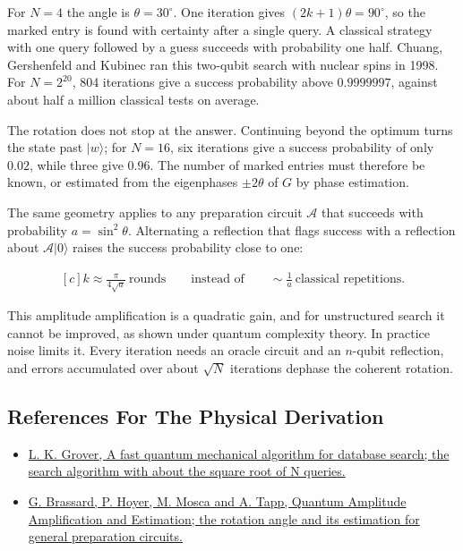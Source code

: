\documentclass[11pt,oneside]{book}
\newenvironment{centeredalign}{\[\begin{gathered}[c]}{\end{gathered}\]}
\begin{document}
For \(N=4\) the angle is \(\theta=30^\circ\). One iteration gives \((2k+1)\theta=90^\circ\), so the marked entry is found with certainty after a single query. A classical strategy with one query followed by a guess succeeds with probability one half. Chuang, Gershenfeld and Kubinec ran this two-qubit search with nuclear spins in 1998. For \(N=2^{20}\), 804 iterations give a success probability above \(0.9999997\), against about half a million classical tests on average.

The rotation does not stop at the answer. Continuing beyond the optimum turns the state past \(|w\rangle\); for \(N=16\), six iterations give a success probability of only \(0.02\), while three give \(0.96\). The number of marked entries must therefore be known, or estimated from the eigenphases \(\pm2\theta\) of \(G\) by phase estimation.

The same geometry applies to any preparation circuit \(\mathcal A\) that succeeds with probability \(a=\sin^2\theta\). Alternating a reflection that flags success with a reflection about \(\mathcal A|0\rangle\) raises the success probability close to one:

\begin{centeredalign}
k\approx\frac{\pi}{4\sqrt a}\ \text{rounds}\qquad\text{instead of}\qquad\sim\frac1a\ \text{classical repetitions}.
\end{centeredalign}

This amplitude amplification is a quadratic gain, and for unstructured search it cannot be improved, as shown under quantum complexity theory. In practice noise limits it. Every iteration needs an oracle circuit and an \(n\)-qubit reflection, and errors accumulated over about \(\sqrt N\) iterations dephase the coherent rotation.

\subsection*{References For The Physical Derivation}
\begin{itemize}
\item \href{https://arxiv.org/abs/quant-ph/9605043}{L. K. Grover, A fast quantum mechanical algorithm for database search; the search algorithm with about the square root of N queries.}
\item \href{https://arxiv.org/abs/quant-ph/0005055}{G. Brassard, P. Hoyer, M. Mosca and A. Tapp, Quantum Amplitude Amplification and Estimation; the rotation angle and its estimation for general preparation circuits.}
\end{itemize}
\end{document}
